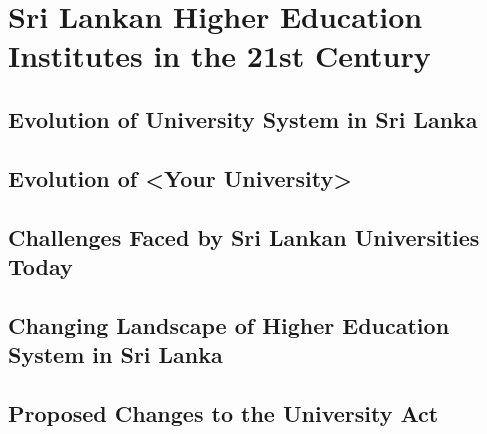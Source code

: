 \chapter{Sri Lankan Higher Education Institutes in the 21st Century}
\section{Evolution of University System in Sri Lanka}
\section{Evolution of <Your University>}
\section{Challenges Faced by Sri Lankan Universities Today}
\section{Changing Landscape of Higher Education System in Sri Lanka}
\section{Proposed Changes to the University Act}